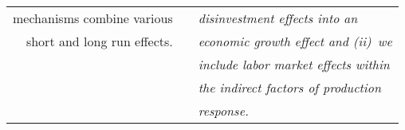 \begin{table}
\begin{center}
\begin{tabular}{ r l l }
mechanisms combine various         &                                             & \emph{disinvestment effects into an} \\
short and long run effects.        &                                             & \emph{economic growth effect and (ii)~we} \\
                                   &                                             & \emph{include labor market effects within} \\ 
                                   &                                             & \emph{the indirect factors of production} \\
                                   &                                             & \emph{response.} \\
\bottomrule
\end{tabular}
\end{center}
\end{table}

